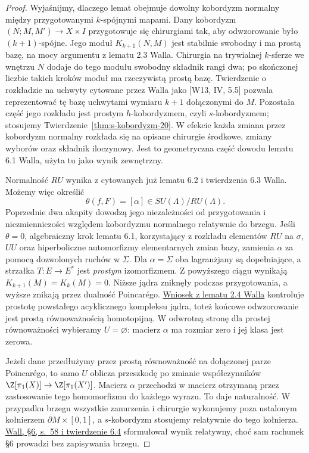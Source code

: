 \begin{proof}
Wyjaśnijmy, dlaczego lemat obejmuje dowolny
kobordyzm normalny między przygotowanymi
$k$-spójnymi mapami. Dany kobordyzm
$(N;M,M')\to X\times I$ przygotowuje się
chirurgiami tak, aby odwzorowanie było
$(k+1)$-spójne. Jego moduł
$K_{k+1}(N,M)$ jest stabilnie swobodny i ma
prostą bazę, na mocy argumentu z lematu 2.3
Walla. Chirurgia na trywialnej $k$-sferze
we wnętrzu $N$ dodaje do tego modułu swobodny
składnik rangi dwa; po skończonej liczbie takich
kroków moduł ma rzeczywistą prostą bazę.
Twierdzenie o rozkładzie na uchwyty cytowane
przez Walla jako [W13, IV, 5.5] pozwala
reprezentować tę bazę uchwytami wymiaru
$k+1$ dołączonymi do $M$. Pozostała część
jego rozkładu jest prostym $h$-kobordyzmem,
czyli $s$-kobordyzmem; stosujemy
Twierdzenie~\ref{thm:s-kobordyzm-20}.
W efekcie każda zmiana przez kobordyzm
normalny rozkłada się na opisane chirurgie
środkowe, zmiany wyborów oraz składnik
iloczynowy. Jest to geometryczna część
dowodu lematu 6.1 Walla, użyta tu jako
wynik zewnętrzny.

Normalność $RU$ wynika z cytowanych już
lematu 6.2 i twierdzenia 6.3 Walla. Możemy
więc określić
\[
 \theta(f,F)=[\alpha]\in SU(\Lambda)/RU(\Lambda).
\]
Poprzednie dwa akapity dowodzą jego
niezależności od przygotowania i niezmienniczości
względem kobordyzmu normalnego relatywnie do
brzegu. Jeśli $\theta=0$, algebraiczny krok
lematu 6.1, korzystający z rozkładu elementów
$RU$ na $\sigma$, $UU$ oraz hiperboliczne
automorfizmy elementarnych zmian bazy,
zamienia $\alpha$ za pomocą dozwolonych
ruchów w $\Sigma$. Dla $\alpha=\Sigma$ oba
lagranżjany są dopełniające, a strzałka
$T:E\to E^*$ jest \emph{prostym} izomorfizmem.
Z powyższego ciągu wynikają
$K_{k+1}(M)=K_k(M)=0$. Niższe jądra
zniknęły podczas przygotowania, a wyższe
znikają przez dualność Poincarégo.
\href{https://www.maths.ed.ac.uk/~v1ranick/books/scm.pdf}
{Wniosek z lematu 2.4 Walla} kontroluje
prostotę powstałego acyklicznego kompleksu
jądra, toteż końcowe odwzorowanie jest
prostą równoważnością homotopijną.
W odwrotną stronę dla prostej równoważności
wybieramy $U=\varnothing$: macierz $\alpha$
ma rozmiar zero i jej klasa jest zerowa.

Jeżeli dane przedłużymy przez prostą
równoważność na dołączonej parze Poincarégo,
to samo $U$ oblicza przeszkodę po zmianie
współczynników
$\Z[\pi_1(X)]\to\Z[\pi_1(X')]$.
Macierz $\alpha$ przechodzi w macierz otrzymaną
przez zastosowanie tego homomorfizmu do
każdego wyrazu. To daje naturalność.
W przypadku brzegu wszystkie zanurzenia i
chirurgie wykonujemy poza ustalonym kołnierzem
$\partial M\times[0,1]$, a $s$-kobordyzm
stosujemy relatywnie do tego kołnierza.
\href{https://www.maths.ed.ac.uk/~v1ranick/books/scm.pdf}
{Wall, §6, s.~58 i twierdzenie 6.4}
sformułował wynik relatywny, choć sam rachunek
§6 prowadzi bez zapisywania brzegu.
\end{proof}

